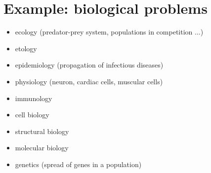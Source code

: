 \section{Example: biological problems}
\begin{itemize}
\item ecology (predator-prey system, populations in competition $\dots$)
\item etology 
\item epidemiology (propagation of infectious diseases)
\item physiology (neuron, cardiac cells, muscular cells)
\item immunology
\item cell biology
\item structural biology
\item molecular biology
\item genetics (spread of genes in a population)
\end{itemize}







%
%
